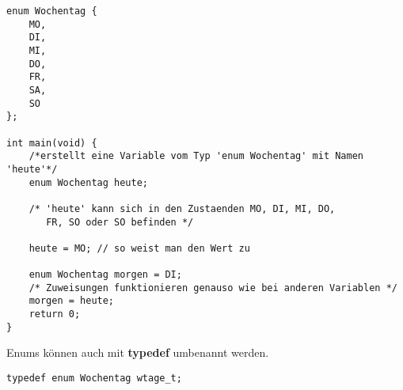 \documentclass[c_worksheet.tex]{subfiles}
\begin{document}
\begin{lstlisting}
enum Wochentag {
    MO,
    DI,
    MI,
    DO,
    FR,
    SA,
    SO
};

int main(void) {
    /*erstellt eine Variable vom Typ 'enum Wochentag' mit Namen 'heute'*/
    enum Wochentag heute;

    /* 'heute' kann sich in den Zustaenden MO, DI, MI, DO,
       FR, SO oder SO befinden */

    heute = MO; // so weist man den Wert zu

    enum Wochentag morgen = DI;
    /* Zuweisungen funktionieren genauso wie bei anderen Variablen */
    morgen = heute;
    return 0;
}
\end{lstlisting}

Enums können auch mit \textbf{typedef} umbenannt werden.

\begin{lstlisting}[numbers=none]
typedef enum Wochentag wtage_t;
\end{lstlisting}
\end{document}
